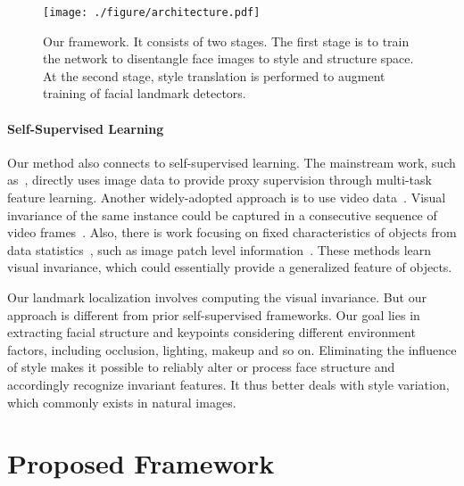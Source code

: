\documentclass[10pt,twocolumn,letterpaper]{article}
\begin{document}
\begin{figure*}[htb]
\begin{center}
 \texttt{[image: ./figure/architecture.pdf]}
\end{center}
\vspace{-0.4cm}
   \caption{{Our framework. It consists of two stages. The first stage is to train the network to disentangle face images to style and structure space. At the second stage, style translation is performed to augment training of facial landmark detectors. }}
\label{fig:framework}
\vspace{-0.2cm}
\end{figure*}

\vspace{-0.1in}
\paragraph{Self-Supervised Learning}
Our method also connects to self-supervised learning. The mainstream work, such as~\cite{zamir2018taskonomy}, directly uses image data to provide proxy supervision through multi-task feature learning. Another widely-adopted approach is to use video data~\cite{wang2015unsupervised}. Visual invariance of the same instance could be captured in a consecutive sequence of video frames~\cite{foldiak1991learning,wiskott2002slow,le2011learning,zou2012deep,taylor2010convolutional,stavens2010unsupervised,wang2015unsupervised}. Also, there is work focusing on fixed characteristics of objects from data statistics~\cite{doersch2015unsupervised,zhang2016colorful,zhang2017split,larsson2016learning,larsson2017colorization}, such as image patch level information~\cite{doersch2015unsupervised}. These methods learn visual invariance, which could essentially provide a generalized feature of objects. 

Our landmark localization involves computing the visual invariance. 
But our approach is different from prior self-supervised frameworks. Our goal lies in extracting facial structure and keypoints considering different environment factors, including occlusion, lighting, makeup and so on. Eliminating the influence of style makes it possible to reliably alter or process face structure and accordingly recognize invariant features. It thus better deals with style variation, which commonly exists in natural images.

\section{Proposed Framework}
\end{document}
